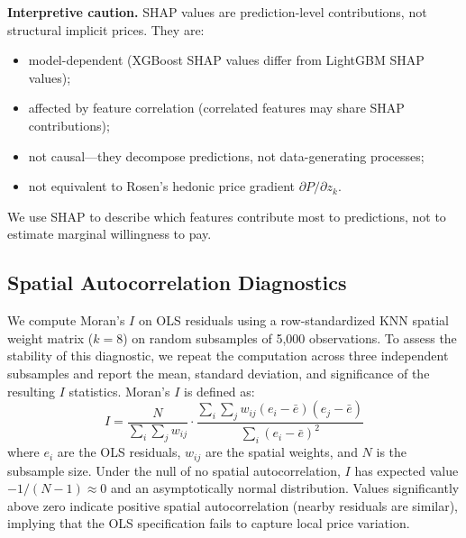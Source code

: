 \textbf{Interpretive caution.} SHAP values are prediction-level contributions, not structural implicit prices. They are:
\begin{itemize}[nosep]
    \item model-dependent (XGBoost SHAP values differ from LightGBM SHAP values);
    \item affected by feature correlation (correlated features may share SHAP contributions);
    \item not causal---they decompose predictions, not data-generating processes;
    \item not equivalent to Rosen's hedonic price gradient $\partial P / \partial z_k$.
\end{itemize}
We use SHAP to describe which features contribute most to predictions, not to estimate marginal willingness to pay.

\subsection{Spatial Autocorrelation Diagnostics}
\label{sec:moran_method}

We compute Moran's $I$ \citep{moran1950notes} on OLS residuals using a row-standardized KNN spatial weight matrix ($k = 8$) on random subsamples of 5,000 observations. To assess the stability of this diagnostic, we repeat the computation across three independent subsamples and report the mean, standard deviation, and significance of the resulting $I$ statistics. Moran's $I$ is defined as:
\begin{equation}
    I = \frac{N}{\sum_{i}\sum_{j} w_{ij}} \cdot \frac{\sum_{i}\sum_{j} w_{ij}(e_i - \bar{e})(e_j - \bar{e})}{\sum_{i}(e_i - \bar{e})^2}
    \label{eq:moran}
\end{equation}
where $e_i$ are the OLS residuals, $w_{ij}$ are the spatial weights, and $N$ is the subsample size. Under the null of no spatial autocorrelation, $I$ has expected value $-1/(N-1) \approx 0$ and an asymptotically normal distribution. Values significantly above zero indicate positive spatial autocorrelation (nearby residuals are similar), implying that the OLS specification fails to capture local price variation.
